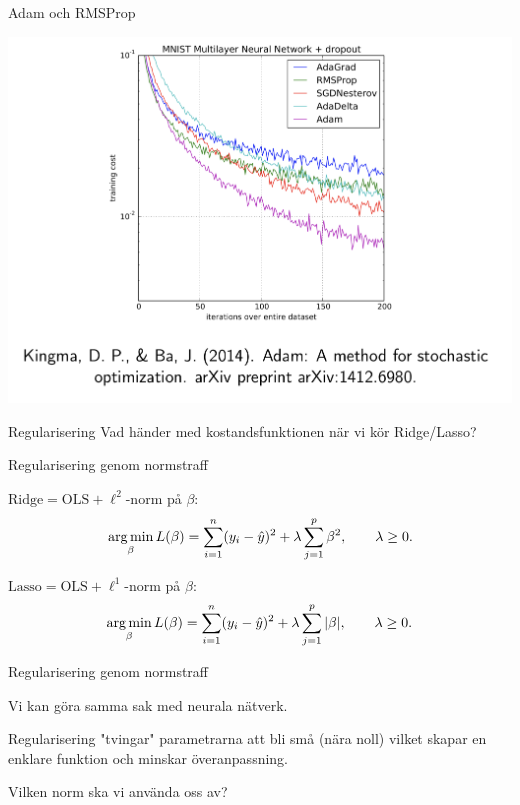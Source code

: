 \documentclass[10pt,english]{beamer}
\begin{document}
\begin{frame}{Adam och RMSProp}

    \includegraphics[width = \textwidth]{figs/DL_training_curves.png}
    
\end{frame}

\begin{frame}{Regularisering}
    Vad händer med kostandsfunktionen när vi kör Ridge/Lasso?

\end{frame}

\begin{frame}{Regularisering genom normstraff}
    
    $\text{Ridge} = \text{OLS} + \ell^2$-norm på $\beta$:
    \begin{equation*}
        \operatorname*{arg\,min}_{\beta} L(\beta) = \sum_{i=1}^{n}(y_i - \hat{y})^2 + \lambda \sum_{j=1}^{p} \beta^2, \qquad \lambda \geq 0.
    \end{equation*}


    $\text{Lasso} = \text{OLS} + \ell^1$-norm på $\beta$:
    \begin{equation*}
        \operatorname*{arg\,min}_{\beta} L(\beta) = \sum_{i=1}^{n}(y_i - \hat{y})^2 + \lambda \sum_{j=1}^{p} |\beta|, \qquad \lambda \geq 0.
    \end{equation*}
\end{frame}

\begin{frame}{Regularisering genom normstraff}
    
    Vi kan göra samma sak med neurala nätverk.

    Regularisering "tvingar" parametrarna att bli små (nära noll) vilket skapar en enklare funktion och minskar överanpassning.

    Vilken norm ska vi använda oss av?

\end{frame}
\end{document}
